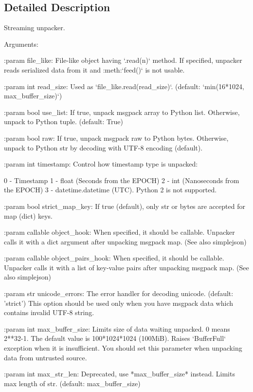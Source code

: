 \subsection{Detailed Description}
\begin{DoxyVerb}Streaming unpacker.

Arguments:

:param file_like:
    File-like object having `.read(n)` method.
    If specified, unpacker reads serialized data from it and :meth:`feed()` is not usable.

:param int read_size:
    Used as `file_like.read(read_size)`. (default: `min(16*1024, max_buffer_size)`)

:param bool use_list:
    If true, unpack msgpack array to Python list.
    Otherwise, unpack to Python tuple. (default: True)

:param bool raw:
    If true, unpack msgpack raw to Python bytes.
    Otherwise, unpack to Python str by decoding with UTF-8 encoding (default).

:param int timestamp:
    Control how timestamp type is unpacked:

        0 - Timestamp
        1 - float  (Seconds from the EPOCH)
        2 - int  (Nanoseconds from the EPOCH)
        3 - datetime.datetime  (UTC).  Python 2 is not supported.

:param bool strict_map_key:
    If true (default), only str or bytes are accepted for map (dict) keys.

:param callable object_hook:
    When specified, it should be callable.
    Unpacker calls it with a dict argument after unpacking msgpack map.
    (See also simplejson)

:param callable object_pairs_hook:
    When specified, it should be callable.
    Unpacker calls it with a list of key-value pairs after unpacking msgpack map.
    (See also simplejson)

:param str unicode_errors:
    The error handler for decoding unicode. (default: 'strict')
    This option should be used only when you have msgpack data which
    contains invalid UTF-8 string.

:param int max_buffer_size:
    Limits size of data waiting unpacked.  0 means 2**32-1.
    The default value is 100*1024*1024 (100MiB).
    Raises `BufferFull` exception when it is insufficient.
    You should set this parameter when unpacking data from untrusted source.

:param int max_str_len:
    Deprecated, use *max_buffer_size* instead.
    Limits max length of str. (default: max_buffer_size)


\end{DoxyVerb}
